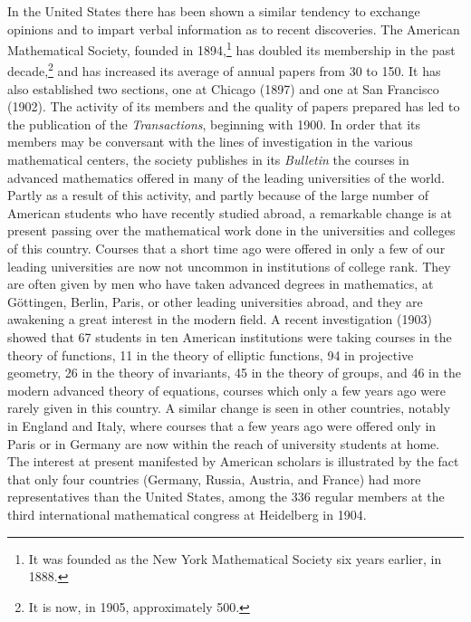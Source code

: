 \documentclass[oneside]{book}
\begin{document}
In the United States there has been shown a similar tendency
to exchange opinions and to impart verbal information
as to recent discoveries. The American Mathematical Society,
founded in 1894,\footnote{It was founded as the New York
Mathematical Society six years earlier, in 1888.} has doubled
its membership in the past decade,\footnote{It is now, in 1905,
approximately 500.}
and has increased its average of annual papers from 30 to 150.
It has also established two sections, one at Chicago (1897) and
one at San Francisco (1902). The activity of its members and
the quality of papers prepared has led to the publication of the
\emph{Transactions}, beginning with 1900. In order that its members
may be conversant with the lines of investigation in the various
mathematical centers, the society publishes in its \emph{Bulletin} the
courses in advanced mathematics offered in many of the leading
universities of the world. Partly as a result of this activity,
and partly because of the large number of American students
who have recently studied abroad, a remarkable change is at
present passing over the mathematical work done in the universities
and colleges of this country. Courses that a short time ago
were offered in only a few of our leading universities are now
not uncommon in institutions of college rank. They are often
given by men who have taken advanced degrees in mathematics,
at G\"ottingen, Berlin, Paris, or other leading universities abroad,
and they are awakening a great interest in the modern field.
A recent investigation (1903) showed that 67 students in ten
American institutions were taking courses in the theory of functions,
11 in the theory of elliptic functions, 94 in projective geometry,
26 in the theory of invariants, 45 in the theory of groups,
and 46 in the modern advanced theory of equations, courses
which only a few years ago were rarely given in this country.
A similar change is seen in other countries, notably in England
and Italy, where courses that a few years ago were offered only
in Paris or in Germany are now within the reach of university
students at home. The interest at present manifested by American
scholars is illustrated by the fact that only four countries (Germany,
Russia, Austria, and France) had more representatives
than the United States, among the 336 regular members at the
third international mathematical congress at Heidelberg in 1904.
\end{document}
